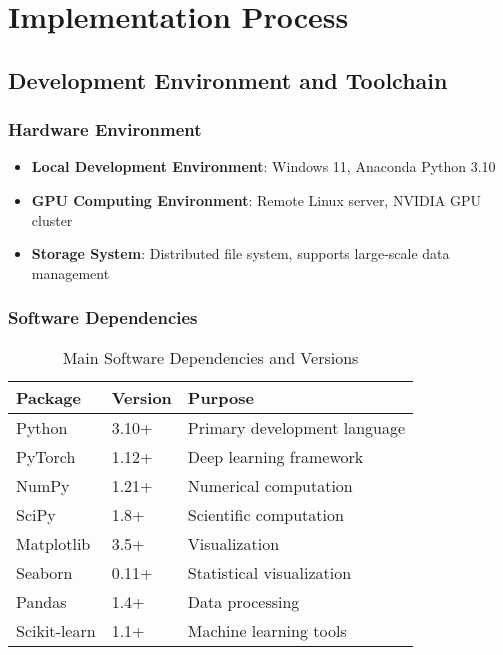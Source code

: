 \section{Implementation Process}
\label{sec:implementation}

\subsection{Development Environment and Toolchain}
\label{subsec:development_environment}

\subsubsection{Hardware Environment}
\begin{itemize}
\item \textbf{Local Development Environment}: Windows 11, Anaconda Python 3.10
\item \textbf{GPU Computing Environment}: Remote Linux server, NVIDIA GPU cluster
\item \textbf{Storage System}: Distributed file system, supports large-scale data management
\end{itemize}

\subsubsection{Software Dependencies}
\begin{table}[h]
\centering
\caption{Main Software Dependencies and Versions}
\label{tab:software_dependencies}
\begin{tabular}{@{}lll@{}}
\toprule
Package & Version & Purpose \\
\midrule
Python & 3.10+ & Primary development language \\
PyTorch & 1.12+ & Deep learning framework \\
NumPy & 1.21+ & Numerical computation \\
SciPy & 1.8+ & Scientific computation \\
Matplotlib & 3.5+ & Visualization \\
Seaborn & 0.11+ & Statistical visualization \\
Pandas & 1.4+ & Data processing \\
Scikit-learn & 1.1+ & Machine learning tools \\
\bottomrule
\end{tabular}
\end{table}

